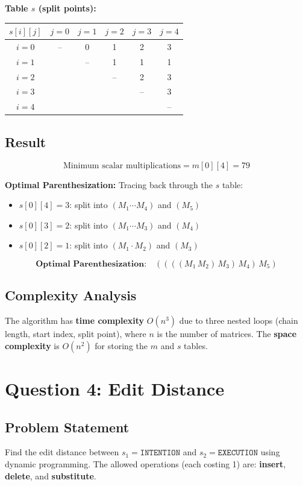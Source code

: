 \documentclass[12pt,a4paper]{article}
\begin{document}
\noindent\textbf{Table $s$ (split points):}
\begin{center}
\begin{tabular}{c|ccccc}
    $s[i][j]$ & $j=0$ & $j=1$ & $j=2$ & $j=3$ & $j=4$ \\ \hline
    $i=0$ & -- & 0 & 1 & 2 & 3 \\
    $i=1$ & & -- & 1 & 1 & 1 \\
    $i=2$ & & & -- & 2 & 3 \\
    $i=3$ & & & & -- & 3 \\
    $i=4$ & & & & & -- \\
\end{tabular}
\end{center}

\subsection*{Result}

\[
    \text{Minimum scalar multiplications} = m[0][4] = \boxed{79}
\]

\noindent\textbf{Optimal Parenthesization:} Tracing back through the $s$ table:
\begin{itemize}[nosep]
    \item $s[0][4] = 3$: split into $(M_1 \cdots M_4)$ and $(M_5)$
    \item $s[0][3] = 2$: split into $(M_1 \cdots M_3)$ and $(M_4)$
    \item $s[0][2] = 1$: split into $(M_1 \cdot M_2)$ and $(M_3)$
\end{itemize}
\[
    \textbf{Optimal Parenthesization:} \quad ((((M_1 \, M_2) \, M_3) \, M_4) \, M_5)
\]

\subsection*{Complexity Analysis}

The algorithm has \textbf{time complexity} $O(n^3)$ due to three nested loops (chain length, start index, split point), where $n$ is the number of matrices. The \textbf{space complexity} is $O(n^2)$ for storing the $m$ and $s$ tables.

\newpage

\section*{Question 4: Edit Distance}

\subsection*{Problem Statement}
Find the edit distance between $s_1 = \texttt{INTENTION}$ and $s_2 = \texttt{EXECUTION}$ using dynamic programming. The allowed operations (each costing 1) are: \textbf{insert}, \textbf{delete}, and \textbf{substitute}.
\end{document}
